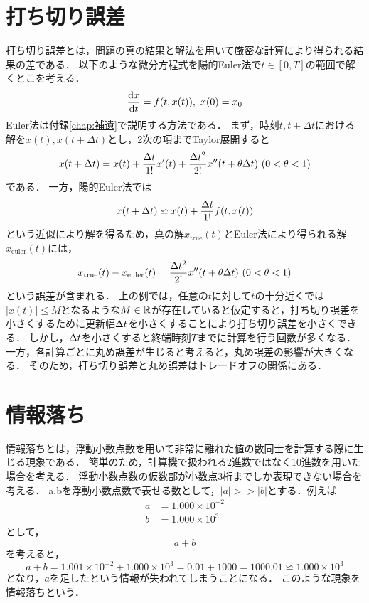 \section{打ち切り誤差}
打ち切り誤差とは，問題の真の結果と解法を用いて厳密な計算により得られる結果の差である．
以下のような微分方程式を陽的Euler法で$t \in [0,T]$の範囲で解くとこを考える．
\begin{equation}
    \frac{\mathrm{d}x}{\mathrm{d}t} = f(t,x(t)), \ x(0) = x_0
\end{equation}
Euler法は付録\ref{chap:補遺}で説明する方法である．
まず，時刻$t,t+\Delta t$における解を$x(t),x(t+\Delta t)$とし，2次の項までTaylor展開すると
\begin{align}
    x(t + \Delta t) = x(t) + \frac{\Delta t}{1!}x^{\prime}(t) + \frac{\Delta t^2}{2!}x^{\prime\prime}(t + \theta\Delta t) \ (0 < \theta < 1)
\end{align}
である．
一方，陽的Euler法では
\begin{align}
    x(t + \Delta t) \backsimeq x(t) + \frac{\Delta t}{1!}f(t,x(t))
\end{align}
という近似により解を得るため，真の解$x_{\mathrm{true}}(t)$とEuler法により得られる解$x_{\mathrm{euler}}(t)$には，
\begin{align}
    x_{\mathrm{true}}(t) - x_{\mathrm{euler}}(t) = \frac{\Delta t^2}{2!}x^{\prime\prime}(t + \theta\Delta t) \ (0 < \theta < 1)
\end{align}
という誤差が含まれる．
上の例では，任意の$t$に対して$t$の十分近くでは$|x(t)| \leq M$となるような$M \in \mathbb{R}$が存在していると仮定すると，打ち切り誤差を小さくするために更新幅$\Delta t$を小さくすることにより打ち切り誤差を小さくできる．
しかし，$\Delta t$を小さくすると終端時刻$T$までに計算を行う回数が多くなる．
一方，各計算ごとに丸め誤差が生じると考えると，丸め誤差の影響が大きくなる．
そのため，打ち切り誤差と丸め誤差はトレードオフの関係にある．


\section{情報落ち}
情報落ちとは，浮動小数点数を用いて非常に離れた値の数同士を計算する際に生じる現象である．
簡単のため，計算機で扱われる2進数ではなく10進数を用いた場合を考える．
浮動小数点数の仮数部が小数点3桁までしか表現できない場合を考える．
a,bを浮動小数点数で表せる数として，$|a| >> |b|$とする．例えば
\begin{align}
    a &= 1.000 \times 10^{-2} \\
    b &= 1.000 \times 10^{3}
\end{align}
として，
\begin{equation}
    a + b
\end{equation}
を考えると，
\begin{equation}
    a + b = 1.001 \times 10^{-2} + 1.000 \times 10^{3} = 0.01 + 1000 = 1000.01 \backsimeq 1.000 \times 10^{3}
\end{equation}
となり，$a$を足したという情報が失われてしまうことになる．
このような現象を情報落ちという．

